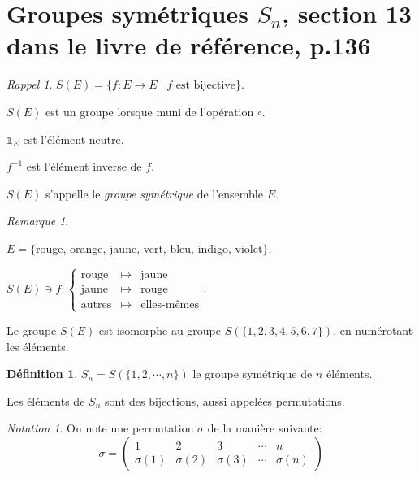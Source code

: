 \documentclass{report}
\newcommand*{\identite}{\mathds{1}}
\theoremstyle{definition}
\newtheorem*{defin}{D\'efinition}
\theoremstyle{remark}
\newtheorem*{nota}{Notation}
\newtheorem*{rema}{Remarque}
\newtheorem*{rappel}{Rappel}
\begin{document}
	\section[Groupes sym\'etriques $S_n$]{Groupes sym\'etriques $S_n$, section 13 dans le livre de r\'ef\'erence, p.136}
	\begin{rappel}
		$S(E) = \{f:E \to E \mid f \text{ est bijective}\}$.

		$S(E)$ est un groupe lorsque muni de l'op\'eration $\circ$.

		$\identite_E$ est l'\'el\'ement neutre.

		$f^{-1}$ est l'\'el\'ement inverse de $f$.

		$S(E)$ s'appelle le \emph{groupe sym\'etrique} de l'ensemble $E$.
	\end{rappel}
	\begin{rema}
		~

		$E = \{$rouge, orange, jaune, vert, bleu, indigo, violet$\}$.

		$S(E) \ni f:\left\lbrace \begin{array}{rcl}
			\text{rouge}&\mapsto&\text{jaune}\\
			\text{jaune}&\mapsto&\text{rouge}\\
			\text{autres}&\mapsto&\text{elles-m\^emes}
		\end{array} \right.$.

		Le groupe $S(E)$ est isomorphe au groupe $S(\{1,2,3,4,5,6,7\})$, en num\'erotant les \'el\'ements.
	\end{rema}
	\begin{defin}
		$S_n = S(\{1,2,\dotsb,n\})$ le groupe sym\'etrique de $n$ \'el\'ements.

		Les \'el\'ements de $S_n$ sont des bijections, aussi appel\'ees permutations.
	\end{defin}
	\begin{nota}
		On note une permutation $\sigma$ de la mani\`ere suivante:
		\[
		\sigma=\begin{pmatrix}
			1&2&3&\dotsb&n\\
			\sigma(1)&\sigma(2)&\sigma(3)&\dotsb&\sigma(n)
		\end{pmatrix}
		\]
	\end{nota}
\end{document}
